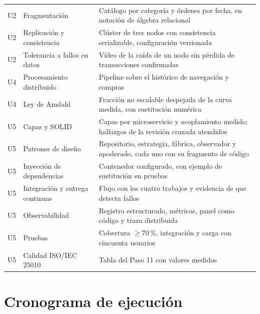 \documentclass[11pt,a4paper]{article}
\begin{document}
\begin{center}
\begin{longtable}{@{}p{1.1cm}p{4.9cm}p{8.9cm}@{}}
			U2 & Fragmentación & Catálogo por categoría y órdenes por fecha, en notación de álgebra relacional \\
			U2 & Replicación y consistencia & Clúster de tres nodos con consistencia serializable, configuración versionada \\
			U2 & Tolerancia a fallos en datos & Vídeo de la caída de un nodo sin pérdida de transacciones confirmadas \\
			U4 & Procesamiento distribuido & Pipeline sobre el histórico de navegación y compras \\
			U4 & Ley de Amdahl & Fracción no escalable despejada de la curva medida, con sustitución numérica \\
			U5 & Capas y SOLID & Capas por microservicio y acoplamiento medido; hallazgos de la revisión cruzada atendidos \\
			U5 & Patrones de diseño & Repositorio, estrategia, fábrica, observador y apoderado, cada uno con su fragmento de código \\
			U5 & Inyección de dependencias & Contenedor configurado, con ejemplo de sustitución en pruebas \\
			U5 & Integración y entrega continuas & Flujo con los cuatro trabajos y evidencia de que detecta fallos \\
			U5 & Observabilidad & Registro estructurado, métricas, panel como código y traza distribuida \\
			U5 & Pruebas & Cobertura $\geq 70\,\%$, integración y carga con cincuenta usuarios \\
			U5 & Calidad ISO/IEC 25010 & Tabla del Paso 11 con valores medidos \\
			\bottomrule
		\end{longtable}
	\end{center}
	
	\section{Cronograma de ejecución}
	
\end{document}
